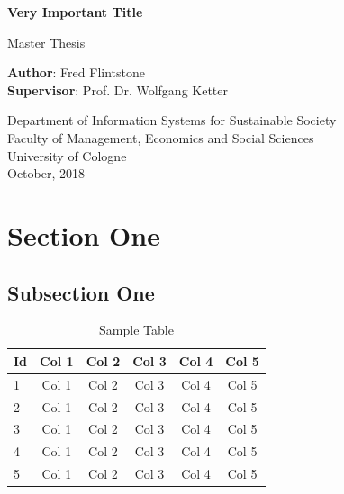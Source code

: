 \documentclass[a4paper]{article}
\begin{document}
\begin{titlepage}
    \begin{center}
        \vspace*{1cm}

        \Large
        \textbf{Very Important Title}

        \vspace{1.5cm}
        Master Thesis

        \vspace{8.0cm}

        \large
        \textbf{Author}: Fred Flintstone\\
        \large
        \textbf{Supervisor}: Prof. Dr. Wolfgang Ketter

        \vspace{1cm}
        \large
        Department of Information Systems for Sustainable Society\\
        Faculty of Management, Economics and Social Sciences\\
        University of Cologne\\

        \vspace{1cm}
        October, 2018

    \end{center}
\end{titlepage}

\tableofcontents
\clearpage
\listoffigures
\clearpage
\listoftables
\clearpage


\section{Section One}
\subsection{Subsection One}
\begin{longtable}{l|ccccc}
\caption{Sample Table}
\label{table:table-1}
\\
\hline
\hline
Id & Col 1 & Col 2 & Col 3 & Col 4 & Col 5\\
\hline
1 & Col 1 & Col 2 & Col 3 & Col 4 & Col 5\\
2 & Col 1 & Col 2 & Col 3 & Col 4 & Col 5\\
3 & Col 1 & Col 2 & Col 3 & Col 4 & Col 5\\
4 & Col 1 & Col 2 & Col 3 & Col 4 & Col 5\\
5 & Col 1 & Col 2 & Col 3 & Col 4 & Col 5\\
\hline
\hline
\end{longtable}
\end{document}

